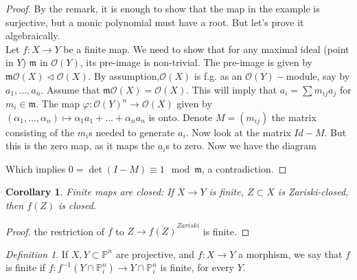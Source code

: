 \documentclass[12pt]{article}
\newtheorem{corollary}[theorem]{Corollary}
\theoremstyle{remark}
\newtheorem{definition}[theorem]{Definition}
\newcommand{\Pp}{\mathbb{P}}
\begin{document}
\begin{proof}
By the remark, it is enough to show that the map in the example is surjective, but a monic polynomial must have a root. But let's prove it algebraically.\\

Let $f: X \rightarrow Y$ be a finite map. We need to show that for any maximal ideal (point in $Y$) $\mathfrak{m}$ in $\mathcal{O}(Y)$, its pre-image is non-trivial. The pre-image is given by $\mathfrak{m} \mathcal{O}(X) \lhd \mathcal{O}(X)$. By assumption,$\mathcal{O}(X)$ is f.g. as an $\mathcal{O}(Y)-$module, say by $a_1,...,a_n$. Assume that $\mathfrak{m}\mathcal{O}(X) = \mathcal{O}(X)$. This will imply that $a_i = \sum m_{ij}a_j$ for $m_i \in \mathfrak{m}$. The map $\varphi: \mathcal{O}(Y)^n \rightarrow \mathcal{O}(X)$ given by $(\alpha_1,...,\alpha_n) \mapsto \alpha_1a_1+...+\alpha_n a_n$ is onto. Denote $M = (m_{ij})$ the matrix consisting of the $m_i$s needed to generate $a_i$. Now look at the matrix $Id-M$. But this is the zero map, as it maps the $a_i$s to zero. Now we have the diagram \\


Which implies $0 = \det(I-M) \equiv 1 \mod \mathfrak{m}$, a contradiction.
\end{proof}

\begin{corollary}
Finite maps are closed: If $X \rightarrow Y$ is finite, $Z \subset X$ is Zariski-closed, then $f(Z)$ is closed.
\end{corollary}

\begin{proof}
the restriction of $f$ to $Z \rightarrow \overline{f(Z)}^{Zariski}$ is finite.

\end{proof}

\begin{definition}
If $X,Y \subset \Pp^n$ are projective, and $f: X \rightarrow Y$ a morphism, we say that $f$ is finite if $f: f^{-1}(Y \cap \Pp_i^n) \rightarrow Y \cap \Pp_i^n$ is finite, for every $Y$.
\end{definition}
\end{document}
